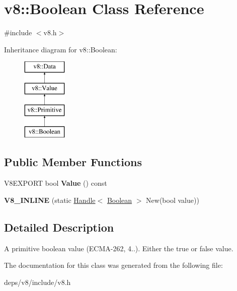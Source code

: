 \hypertarget{classv8_1_1_boolean}{}\section{v8\+:\+:Boolean Class Reference}
\label{classv8_1_1_boolean}


{\ttfamily \#include $<$v8.\+h$>$}

Inheritance diagram for v8\+:\+:Boolean\+:\begin{figure}[H]
\begin{center}
\leavevmode
\includegraphics[height=4.000000cm]{classv8_1_1_boolean}
\end{center}
\end{figure}
\subsection*{Public Member Functions}
\begin{DoxyCompactItemize}
\item 
\hypertarget{classv8_1_1_boolean_a34a8f0766f4c47db86a1a18aa751bbab}{}V8\+E\+X\+P\+O\+R\+T bool {\bfseries Value} () const \label{classv8_1_1_boolean_a34a8f0766f4c47db86a1a18aa751bbab}

\item 
\hypertarget{classv8_1_1_boolean_a2d99e44e4f243fc0fd567ad64b88b28d}{}{\bfseries V8\+\_\+\+I\+N\+L\+I\+N\+E} (static \hyperlink{classv8_1_1_handle}{Handle}$<$ \hyperlink{classv8_1_1_boolean}{Boolean} $>$ New(bool value))\label{classv8_1_1_boolean_a2d99e44e4f243fc0fd567ad64b88b28d}

\end{DoxyCompactItemize}


\subsection{Detailed Description}
A primitive boolean value (E\+C\+M\+A-\/262, 4..). Either the true or false value. 

The documentation for this class was generated from the following file\+:\begin{DoxyCompactItemize}
\item 
deps/v8/include/v8.\+h\end{DoxyCompactItemize}
